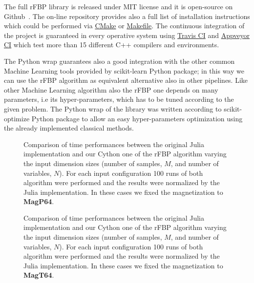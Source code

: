 \documentclass{standalone}
\begin{document}
The full \textsf{rFBP} library is released under MIT license and it is open-source on Github~\cite{ReplicatedFocusingBeliefPropagation}.
The on-line repository provides also a full list of installation instructions which could be performed via \href{https://github.com/Nico-Curti/rFBP/blob/master/CMakeLists.txt
}{\textsf{CMake}} or \href{https://github.com/Nico-Curti/rFBP/blob/master/Makefile}{\textsf{Makefile}}.
The continuous integration of the project is guaranteed in every operative system using \href{https://github.com/Nico-Curti/rFBP/blob/master/.travis.yml}{\textsf{Travis CI}} and \href{https://github.com/Nico-Curti/rFBP/blob/master/appveyor.yml}{\textsf{Appveyor CI}} which test more than 15 different \textsf{C++} compilers and environments.

The \textsf{Python} wrap guarantees also a good integration with the other common Machine Learning tools provided by \textsf{scikit-learn} \textsf{Python} package; in this way we can use the \textsf{rFBP} algorithm as equivalent alternative also in other pipelines.
Like other Machine Learning algorithm also the \textsf{rFBP} one depends on many parameters, i.e its hyper-parameters, which has to be tuned according to the given problem.
The \textsf{Python} wrap of the library was written according to \textsf{scikit-optimize} \textsf{Python} package to allow an easy hyper-parameters optimization using the already implemented classical methods.


\begin{figure}[htbp]
\centering
\def\svgwidth{0.85\textwidth}

\caption{Comparison of time performances between the original \textsf{Julia} implementation and our \textsf{Cython} one of the \textsf{rFBP} algorithm varying the input dimension sizes (number of samples, $M$, and number of variables, $N$).
For each input configuration 100 runs of both algorithm were performed and the results were normalized by the \textsf{Julia} implementation.
In these cases we fixed the magnetization to \textbf{MagP64}.
}
\label{fig:rfbp_magp}
\end{figure}

\begin{figure}[htbp]
\centering
\def\svgwidth{0.85\textwidth}

\caption{Comparison of time performances between the original \textsf{Julia} implementation and our \textsf{Cython} one of the \textsf{rFBP} algorithm varying the input dimension sizes (number of samples, $M$, and number of variables, $N$).
For each input configuration 100 runs of both algorithm were performed and the results were normalized by the \textsf{Julia} implementation.
In these cases we fixed the magnetization to \textbf{MagT64}.
}
\label{fig:rfbp_magt}
\end{figure}
\end{document}
